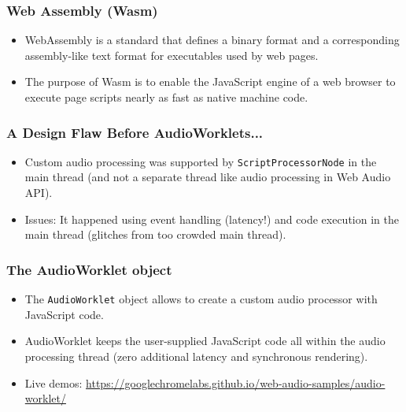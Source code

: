\documentclass[screen, aspectratio=43]{beamer}
\begin{document}
%
\begin{frame}
\frametitle{Web Assembly (Wasm)}
\begin{itemize}
\item WebAssembly is a standard that defines a binary format and a corresponding assembly-like text format for executables used by web pages.
\item The purpose of Wasm is to enable the JavaScript engine of a web browser to execute page scripts nearly as fast as native machine code.
\end{itemize}
\vspace{2 mm}
\end{frame}
%
\begin{frame}
\frametitle{A Design Flaw Before AudioWorklets...}
\begin{itemize}
\item Custom audio processing was supported by \texttt{ScriptProcessorNode} in the main thread (and not a separate thread like audio processing in Web Audio API).
\item Issues: It happened using event handling (latency!) and code execution in the main thread (glitches from too crowded main thread).
\end{itemize}
\vspace{2 mm}
\end{frame}
%
\begin{frame}
\frametitle{The AudioWorklet object}
\begin{itemize}
\item The \texttt{AudioWorklet} object allows to create a custom audio processor with JavaScript code.
\item AudioWorklet keeps the user-supplied JavaScript code all within the audio processing thread (zero additional latency and synchronous rendering).
\item Live demos: \url{https://googlechromelabs.github.io/web-audio-samples/audio-worklet/}
\end{itemize}
\vspace{2 mm}
\end{frame}
%
\end{document}
